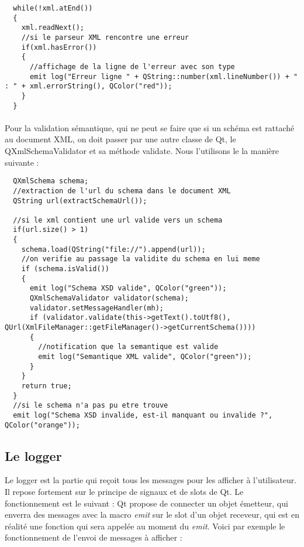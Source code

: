 \begin{lstlisting}
  while(!xml.atEnd())
  {
    xml.readNext();
    //si le parseur XML rencontre une erreur
    if(xml.hasError())
    {
      //affichage de la ligne de l'erreur avec son type
      emit log("Erreur ligne " + QString::number(xml.lineNumber()) + " : " + xml.errorString(), QColor("red"));
    }
  }
\end{lstlisting}
\paragraph{}
Pour la validation sémantique, qui ne peut se faire que si un schéma est rattaché au document XML, on doit passer par une autre classe de Qt, le QXmlSchemaValidator et sa méthode validate. Nous l'utilisons le la manière suivante :
\begin{lstlisting}
  QXmlSchema schema;
  //extraction de l'url du schema dans le document XML
  QString url(extractSchemaUrl());

  //si le xml contient une url valide vers un schema
  if(url.size() > 1)
  {
    schema.load(QString("file://").append(url));
    //on verifie au passage la validite du schema en lui meme
    if (schema.isValid())
    {
      emit log("Schema XSD valide", QColor("green"));
      QXmlSchemaValidator validator(schema);
      validator.setMessageHandler(mh);
      if (validator.validate(this->getText().toUtf8(), QUrl(XmlFileManager::getFileManager()->getCurrentSchema())))
      {
        //notification que la semantique est valide
        emit log("Semantique XML valide", QColor("green"));
      }
    }
    return true;
  }
  //si le schema n'a pas pu etre trouve
  emit log("Schema XSD invalide, est-il manquant ou invalide ?", QColor("orange"));
\end{lstlisting}
\paragraph{}
\subsection{Le logger}
Le logger est la partie qui reçoit tous les messages pour les afficher à l'utilisateur. Il repose fortement sur le principe de signaux et de slots de Qt. Le fonctionnement est le suivant : Qt propose de connecter un objet émetteur, qui enverra des messages avec la macro \textit{emit} sur le slot d'un objet receveur, qui est en réalité une fonction qui sera appelée au moment du \textit{emit}. Voici par exemple le fonctionnement de l'envoi de messages à afficher :


